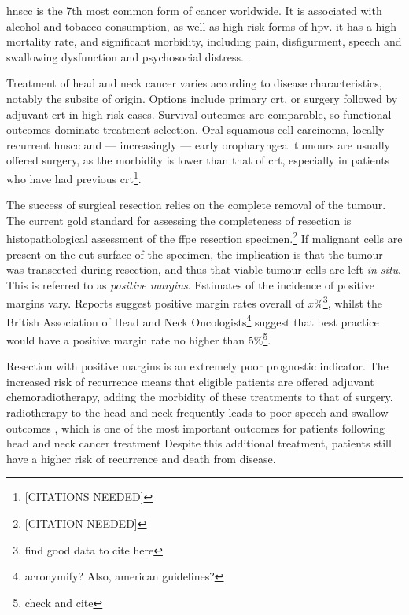 
\Gls{hnscc} is the 7th most common form of cancer worldwide. 
It is associated with alcohol and tobacco consumption, as well as high-risk forms of \gls{hpv}.
it has a high mortality rate, and significant morbidity, including pain, disfigurment, speech and swallowing dysfunction and psychosocial distress. \cite{chowHeadNeckCancer2020}.

Treatment of head and neck cancer varies according to disease characteristics, notably the subsite of origin.
Options include primary \gls{crt}, or surgery followed by adjuvant \gls{crt} in high risk cases.
Survival outcomes are comparable, so functional outcomes dominate treatment selection.
Oral squamous cell carcinoma, locally recurrent \gls{hnscc} and --- increasingly --- early oropharyngeal tumours are usually offered surgery, as the morbidity is lower than that of \gls{crt}, especially in patients who have had previous \gls{crt}\footnote{[CITATIONS NEEDED]}.

The success of surgical resection relies on the complete removal of the tumour.
The current gold standard for assessing the completeness of resection is histopathological assessment of the \gls{ffpe} resection specimen.\footnote{[CITATION NEEDED]}
If malignant cells are present on the cut surface of the specimen, the implication is that the tumour was transected during resection, and thus that viable tumour cells are left \textit{in situ}.
This is referred to as \emph{positive margins}.
Estimates of the incidence of positive margins vary.
Reports suggest positive margin rates overall of $x$\%\footnote{find good data to cite here}, whilst the British Association of Head and Neck Oncologists\footnote{acronymify? Also, american guidelines?} suggest that best practice would have a positive margin rate no higher than 5\%\footnote{check and cite}.

Resection with positive margins is an extremely poor prognostic indicator.
The increased risk of recurrence means that eligible patients are offered adjuvant chemoradiotherapy, adding the morbidity of these treatments to that of surgery.
radiotherapy to the head and neck frequently leads to poor speech and swallow outcomes \cite{machtayFactorsAssociatedSevere2008, wangPharyngoesophagealStrictureTreatment2012}, which is one of the most important outcomes for patients following head and neck cancer treatment \cite{wilsonDysphagiaNonsurgicalHead2011} 
Despite this additional treatment, patients still have a higher risk of recurrence and death from disease.

